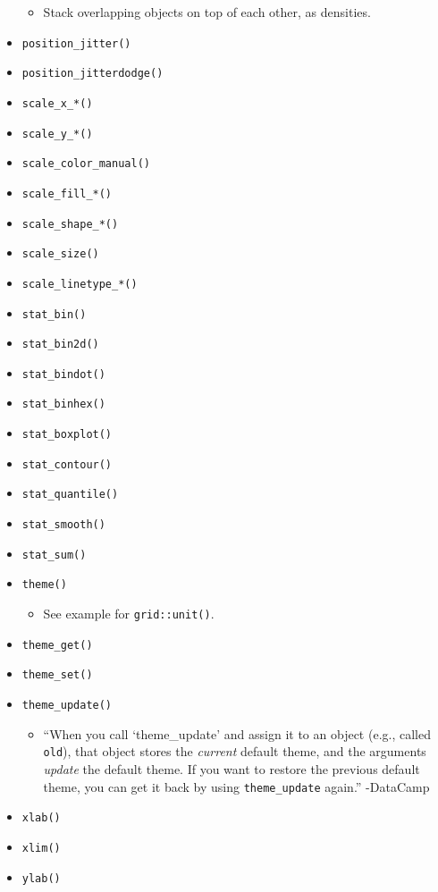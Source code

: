\documentclass[
]{book}
\providecommand{\tightlist}{%
  \setlength{\itemsep}{0pt}\setlength{\parskip}{0pt}}
\begin{document}
\begin{itemize}
  \begin{itemize}
  \tightlist
  \item
    Stack overlapping objects on top of each other, as densities.
  \end{itemize}
\item
  \texttt{position\_jitter()}
\item
  \texttt{position\_jitterdodge()}
\item
  \texttt{scale\_x\_*()}
\item
  \texttt{scale\_y\_*()}
\item
  \texttt{scale\_color\_manual()}
\item
  \texttt{scale\_fill\_*()}
\item
  \texttt{scale\_shape\_*()}
\item
  \texttt{scale\_size()}
\item
  \texttt{scale\_linetype\_*()}
\item
  \texttt{stat\_bin()}
\item
  \texttt{stat\_bin2d()}
\item
  \texttt{stat\_bindot()}
\item
  \texttt{stat\_binhex()}
\item
  \texttt{stat\_boxplot()}
\item
  \texttt{stat\_contour()}
\item
  \texttt{stat\_quantile()}
\item
  \texttt{stat\_smooth()}
\item
  \texttt{stat\_sum()}
\item
  \texttt{theme()}

  \begin{itemize}
  \tightlist
  \item
    See example for \texttt{grid::unit()}.
  \end{itemize}
\item
  \texttt{theme\_get()}
\item
  \texttt{theme\_set()}
\item
  \texttt{theme\_update()}

  \begin{itemize}
  \tightlist
  \item
    ``When you call `theme\_update' and assign it to an object (e.g., called \texttt{old}), that object stores the \emph{current} default theme, and the arguments \emph{update} the default theme. If you want to restore the previous default theme, you can get it back by using \texttt{theme\_update} again.'' -DataCamp
  \end{itemize}
\item
  \texttt{xlab()}
\item
  \texttt{xlim()}
\item
  \texttt{ylab()}
\end{itemize}
\end{document}
